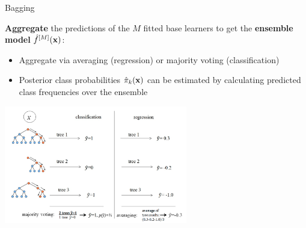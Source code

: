 \documentclass[11pt,compress,t,notes=noshow, xcolor=table]{beamer}
\begin{document}
\begin{vbframe}{Bagging}
\framebreak

\textbf{Aggregate} the predictions of the $M$ fitted base learners to get the
\textbf{ensemble model} $\hat f^{[M]}(\mathbf{x})$:
  \begin{itemize}
    \item Aggregate via averaging (regression) or majority voting (classification)
    \item Posterior class probabilities $\hat \pi_{k}(\mathbf{x})$ can be estimated by calculating predicted class frequencies over the ensemble
  \end{itemize}

\begin{center}
\includegraphics[width=0.6\textwidth]{figure_man/rf_majvot_averaging.png}
\end{center}
\end{vbframe}

\end{document}
